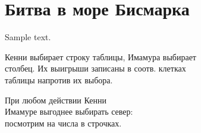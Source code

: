 \documentclass[12pt,aspectratio=43,svgnames]{beamer}
\begin{document}
 \maketitle

\begin{frame} 
	\tableofcontents
\end{frame}

\section{Битва в море Бисмарка}

\begin{frame} 
Sample text.~{\scriptsize\cite{petersGT}}
\end{frame}

\newcommand{\bismarckPO}{\gamePayoffs{2}{-2}{2.5}{-2.5}{1.5}{-1.5}{3}{-3}}

\begin{frame} 
Кенни выбирает строку таблицы, Имамура выбирает\\
столбец. Их выигрыши записаны в соотв. клетках\\
таблицы напротив их выбора.
\begin{center}  \end{center}
\end{frame}

\begin{frame} 
При любом действии Кенни\\
Имамуре выгоднее выбирать север:\\
посмотрим на числа в строчках.
\begin{center}  \end{center}
\end{frame}

\begin{frame} 
	\cite{petersGT,mszGT,brusselsEVO,derivativeEVO}
\end{frame}

\begin{frame} \scriptsize
	
	
\end{frame}
\end{document}

